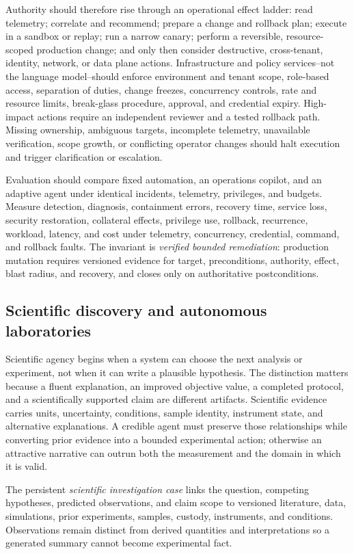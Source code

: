 Authority should therefore rise through an operational effect ladder: read telemetry; correlate and recommend; prepare a change and rollback plan; execute in a sandbox or replay; run a narrow canary; perform a reversible, resource-scoped production change; and only then consider destructive, cross-tenant, identity, network, or data plane actions. Infrastructure and policy services--not the language model--should enforce environment and tenant scope, role-based access, separation of duties, change freezes, concurrency controls, rate and resource limits, break-glass procedure, approval, and credential expiry. High-impact actions require an independent reviewer and a tested rollback path. Missing ownership, ambiguous targets, incomplete telemetry, unavailable verification, scope growth, or conflicting operator changes should halt execution and trigger clarification or escalation.

Evaluation should compare fixed automation, an operations copilot, and an adaptive agent under identical incidents, telemetry, privileges, and budgets. Measure detection, diagnosis, containment errors, recovery time, service loss, security restoration, collateral effects, privilege use, rollback, recurrence, workload, latency, and cost under telemetry, concurrency, credential, command, and rollback faults. The invariant is \emph{verified bounded remediation}: production mutation requires versioned evidence for target, preconditions, authority, effect, blast radius, and recovery, and closes only on authoritative postconditions.

\subsection{Scientific discovery and autonomous laboratories}

Scientific agency begins when a system can choose the next analysis or experiment, not when it can write a plausible hypothesis. The distinction matters because a fluent explanation, an improved objective value, a completed protocol, and a scientifically supported claim are different artifacts. Scientific evidence carries units, uncertainty, conditions, sample identity, instrument state, and alternative explanations. A credible agent must preserve those relationships while converting prior evidence into a bounded experimental action; otherwise an attractive narrative can outrun both the measurement and the domain in which it is valid.

The persistent \emph{scientific investigation case} links the question, competing hypotheses, predicted observations, and claim scope to versioned literature, data, simulations, prior experiments, samples, custody, instruments, and conditions. Observations remain distinct from derived quantities and interpretations so a generated summary cannot become experimental fact.


